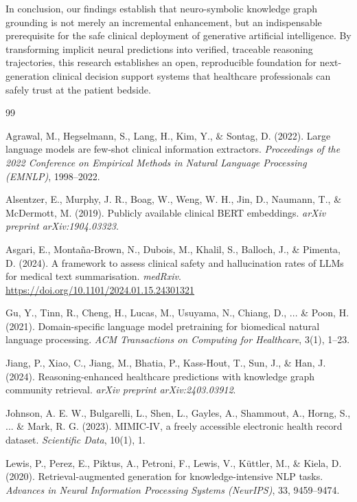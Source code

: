 \documentclass[11pt, a4paper]{article}
\begin{document}
In conclusion, our findings establish that neuro-symbolic knowledge graph grounding is not merely an incremental enhancement, but an indispensable prerequisite for the safe clinical deployment of generative artificial intelligence. By transforming implicit neural predictions into verified, traceable reasoning trajectories, this research establishes an open, reproducible foundation for next-generation clinical decision support systems that healthcare professionals can safely trust at the patient bedside.

\begin{thebibliography}{99}

Agrawal, M., Hegselmann, S., Lang, H., Kim, Y., \& Sontag, D. (2022).
Large language models are few-shot clinical information extractors.
\textit{Proceedings of the 2022 Conference on Empirical Methods in Natural Language Processing (EMNLP)}, 1998--2022.

Alsentzer, E., Murphy, J. R., Boag, W., Weng, W. H., Jin, D., Naumann, T., \& McDermott, M. (2019).
Publicly available clinical BERT embeddings.
\textit{arXiv preprint arXiv:1904.03323}.

Asgari, E., Monta\~na-Brown, N., Dubois, M., Khalil, S., Balloch, J., \& Pimenta, D. (2024).
A framework to assess clinical safety and hallucination rates of LLMs for medical text summarisation.
\textit{medRxiv}. \url{https://doi.org/10.1101/2024.01.15.24301321}

Gu, Y., Tinn, R., Cheng, H., Lucas, M., Usuyama, N., Chiang, D., ... \& Poon, H. (2021).
Domain-specific language model pretraining for biomedical natural language processing.
\textit{ACM Transactions on Computing for Healthcare}, 3(1), 1--23.

Jiang, P., Xiao, C., Jiang, M., Bhatia, P., Kass-Hout, T., Sun, J., \& Han, J. (2024).
Reasoning-enhanced healthcare predictions with knowledge graph community retrieval.
\textit{arXiv preprint arXiv:2403.03912}.

Johnson, A. E. W., Bulgarelli, L., Shen, L., Gayles, A., Shammout, A., Horng, S., ... \& Mark, R. G. (2023).
MIMIC-IV, a freely accessible electronic health record dataset.
\textit{Scientific Data}, 10(1), 1.

Lewis, P., Perez, E., Piktus, A., Petroni, F., Lewis, V., K\"uttler, M., \& Kiela, D. (2020).
Retrieval-augmented generation for knowledge-intensive NLP tasks.
\textit{Advances in Neural Information Processing Systems (NeurIPS)}, 33, 9459--9474.


\end{thebibliography}
\end{document}
